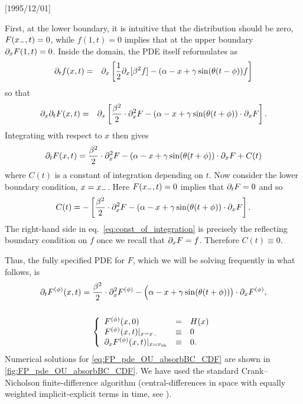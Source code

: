 \NeedsTeXFormat{LaTeX2e}[1995/12/01] \documentclass[10pt]{bmc_article}
\newenvironment{bmcformat}{\begin{raggedright}\baselineskip20pt\sloppy\setboolean{publ}{false}}{\end{raggedright}\baselineskip20pt\sloppy}
\begin{document}
\begin{bmcformat}
First, at the lower boundary, it is intuitive that the distribution should be
zero, $ F({ x_{-} },t) = 0 $, while $f(1,t) = 0$ implies that at the upper boundary
$ {\partial}_xF(1, t) = 0 $. Inside the domain, the PDE itself reformulates as
\begin{eqnarray*}
{\partial}_t f(x,t) &=&  {\partial}_x \left[\frac{1}{2}{\partial}_x [{\beta}^2 f] -  ({\alpha} - x + {\gamma } \sin({\theta}
(t - \phi)) f \right]
\end{eqnarray*}
so that
\begin{eqnarray*}
{\partial}_x {\partial}_t F(x,t) &=& {\partial}_x \left[
\frac{{\beta}^2 }{2}\cdot {\partial}^2_x F -  
						({\alpha}- x + {\gamma } \sin({\theta} (t + \phi))  \cdot {\partial}_xF \right].
\end{eqnarray*}
Integrating with respect to $x$ then gives
$$
{\partial}_t F(x,t) =
\frac{{\beta}^2 }{2}\cdot {\partial}^2_x F -  
						({\alpha}- x + {\gamma } \sin({\theta} (t + \phi))  \cdot {\partial}_xF + C(t)
$$
where $C(t)$ is a constant of integration depending on $t$. Now consider
the lower boundary condition, $x =
{ x_{-} }$. Here $F({ x_{-} },t) = 0$ implies that ${\partial}_tF = 0$ and so 
\begin{equation}
C(t) = - \left[ \frac{{\beta}^2 }{2}\cdot {\partial}^2_x F -  
			({\alpha}- x + {\gamma } \sin({\theta} (t + \phi))  \cdot {\partial}_xF \right].	
\label{eq:const_of_integration}
\end{equation}
The right-hand side in eq.\ \eqref{eq:const_of_integration} is precisely the
reflecting boundary condition on $f$ once we recall that ${\partial}_x F = f$. Therefore $C(t) \equiv 0$.

Thus, the fully specified PDE for $F$, which we will be solving frequently in what
follows, is
\begin{equation}
\begin{gathered}
	{\partial}_t F^{(\phi)}(x,t) =
					\frac{{\beta}^2 }{2}\cdot {\partial}^2_x F^{(\phi)} -  
					\Big({\alpha}- x + {\gamma } \sin({\theta} (t + \phi))\big)  \cdot {\partial}_x F^{(\phi)},
	\\
	\\
	\left\{ \begin{array}{lcl}
	 F^{(\phi)}(x,0) &=& H(x)
	\\
	F^{(\phi)}(x,t) |_{x={ x_{-} }} &\equiv& 0 
	\\
	{\partial}_x F^{(\phi)}(x,t) |_{x={ v_{\textrm{th} } }} &\equiv& 0.
	\end{array} \right.
\label{eq:FP_pde_OU_absorbBC_CDF}
\end{gathered}
\end{equation}
Numerical solutions for \cref{eq:FP_pde_OU_absorbBC_CDF} are shown in
\cref{fig:FP_pde_OU_absorbBC_CDF}. We have used the standard Crank--Nicholson
finite-difference algorithm (central-differences in space with equally weighted
implicit-explicit terms in time, see \cite{Karniadakis2003}). 


\end{bmcformat}
\end{document}
